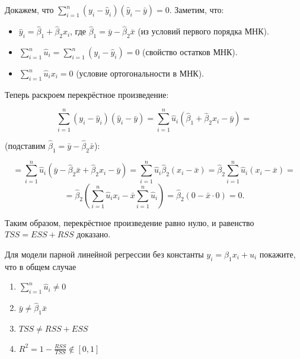 \documentclass[12pt]{article}
\newcommand{\hb}{\hat{\beta}}
\newcommand{\hu}{\hat{u}}
\newcommand{\RSS}{RSS}
\newcommand{\ESS}{ESS}
\newcommand{\TSS}{TSS}
\begin{document}
\begin{sol}
\begin{enumerate}
Докажем, что $\sum_{i=1}^n (y_i - \hat{y}_i)(\hat{y}_i - \bar{y}) = 0$.
Заметим, что:
\begin{itemize}
    \item \(\hat{y}_i = \hat{\beta}_1 + \hat{\beta}_2 x_i\), где \(\hat{\beta}_1 = \bar{y} - \hat{\beta}_2 \bar{x}\) (из условий первого порядка МНК).
    \item \(\sum_{i=1}^n \hat{u}_i = \sum_{i=1}^n (y_i - \hat{y}_i) = 0\) (свойство остатков МНК).
    \item \(\sum_{i=1}^n \hat{u}_i x_i = 0\) (условие ортогональности в МНК).
\end{itemize}

Теперь раскроем перекрёстное произведение:

\[
\sum_{i=1}^n (y_i - \hat{y}_i)(\hat{y}_i - \bar{y}) = \sum_{i=1}^n \hat{u}_i (\hat{\beta}_1 + \hat{\beta}_2 x_i - \bar{y}) =
\]

(подставим $\hat{\beta}_1 = \bar{y} - \hat{\beta}_2 \bar{x}$):

\[
= \sum_{i=1}^n \hat{u}_i (\bar{y} - \hat{\beta}_2 \bar{x} + \hat{\beta}_2 x_i - \bar{y}) = \sum_{i=1}^n \hat{u}_i \hat{\beta}_2 (x_i - \bar{x}) = \hat{\beta}_2 \sum_{i=1}^n \hat{u}_i (x_i - \bar{x}) =
\]
\[
= \hat{\beta}_2 \left( \sum_{i=1}^n \hat{u}_i x_i - \bar{x} \sum_{i=1}^n \hat{u}_i \right) = \hat{\beta}_2 (0 - \bar{x} \cdot 0) = 0.
\]

Таким образом, перекрёстное произведение равно нулю, и равенство $\TSS = \ESS + \RSS$ доказано.
\end{enumerate}
\end{sol}

\begin{problem}
    Для модели парной линейной регрессии без константы $y_i = \beta_1 x_i + u_i$ покажите, что в общем случае

    \begin{enumerate}
        \item $\sum^n_{i=1} \hu_i \neq 0$
        \item $\bar{y} \neq \hb_1 \bar{x}$
        \item $\TSS \neq \RSS + \ESS$
        \item $R^2 = 1 - \frac{RSS}{TSS} \notin [0, 1]$
    \end{enumerate}
\end{problem}
\end{document}
